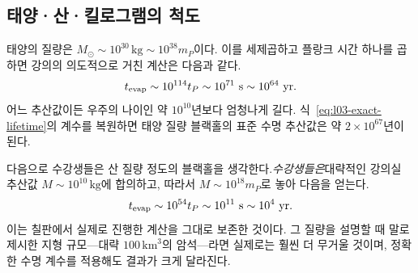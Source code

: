 \subsection{태양·산·킬로그램의 척도}

태양의 질량은 \(M_\odot\sim10^{30}\,\mathrm{kg}\sim10^{38}m_P\)이다. 이를 세제곱하고 플랑크 시간 하나를 곱하면 강의의 의도적으로 거친 계산은 다음과 같다.
\begin{equation}
t_{\mathrm{evap}}\sim10^{114}t_P
\sim10^{71}\ {\rm s}
\sim10^{64}\ {\rm yr}.
\end{equation}
어느 추산값이든 우주의 나이인 약 \(10^{10}\)년보다 엄청나게 길다. 식~\eqref{eq:l03-exact-lifetime}의 계수를 복원하면 태양 질량 블랙홀의 표준 수명 추산값은 약 \(2\times10^{67}\)년이 된다.

다음으로 수강생들은 산 질량 정도의 블랙홀을 생각한다.\emph{수강생들은}대략적인 강의실 추산값 \(M\sim10^{10}\,\mathrm{kg}\)에 합의하고, 따라서 \(M\sim10^{18}m_P\)로 놓아 다음을 얻는다.
\begin{equation}
t_{\mathrm{evap}}\sim10^{54}t_P
\sim10^{11}\ {\rm s}
\sim10^4\ {\rm yr}.
\end{equation}
이는 칠판에서 실제로 진행한 계산을 그대로 보존한 것이다. 그 질량을 설명할 때 말로 제시한 지형 규모---대략 \(100\,\mathrm{km}^3\)의 암석---라면 실제로는 훨씬 더 무거울 것이며, 정확한 수명 계수를 적용해도 결과가 크게 달라진다.

\begin{classroomqa}\end{classroomqa}

\begin{classroomqa}\end{classroomqa}

